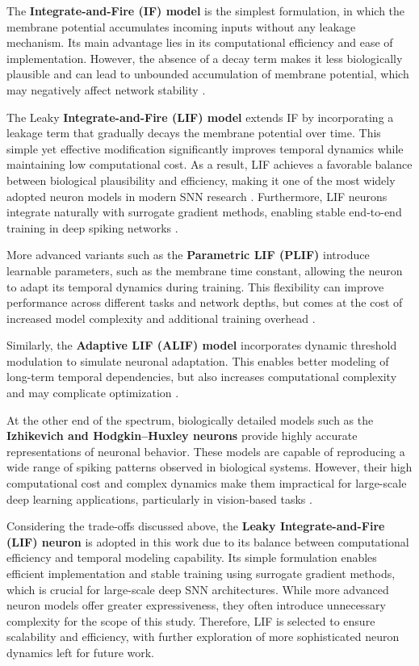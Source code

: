 \documentclass[../main.tex]{subfiles}
\begin{document}
The \textbf{Integrate-and-Fire (IF) model} is the simplest formulation, in which the membrane potential accumulates incoming inputs without any leakage mechanism. Its main advantage lies in its computational efficiency and ease of implementation. However, the absence of a decay term makes it less biologically plausible and can lead to unbounded accumulation of membrane potential, which may negatively affect network stability \cite{Gerstner_Kistler_2002}.

The Leaky \textbf{Integrate-and-Fire (LIF) model} extends IF by incorporating a leakage term that gradually decays the membrane potential over time. This simple yet effective modification significantly improves temporal dynamics while maintaining low computational cost. As a result, LIF achieves a favorable balance between biological plausibility and efficiency, making it one of the most widely adopted neuron models in modern SNN research \cite{Gerstner_Kistler_2002, neftci2019surrogate}. Furthermore, LIF neurons integrate naturally with surrogate gradient methods, enabling stable end-to-end training in deep spiking networks \cite{neftci2019surrogate}.

More advanced variants such as the \textbf{Parametric LIF (PLIF)} introduce learnable parameters, such as the membrane time constant, allowing the neuron to adapt its temporal dynamics during training. This flexibility can improve performance across different tasks and network depths, but comes at the cost of increased model complexity and additional training overhead \cite{fang2021incorporating}.

Similarly, the \textbf{Adaptive LIF (ALIF) model} incorporates dynamic threshold modulation to simulate neuronal adaptation. This enables better modeling of long-term temporal dependencies, but also increases computational complexity and may complicate optimization \cite{bellec2018long}.

At the other end of the spectrum, biologically detailed models such as the \textbf{Izhikevich and Hodgkin--Huxley neurons} provide highly accurate representations of neuronal behavior. These models are capable of reproducing a wide range of spiking patterns observed in biological systems. However, their high computational cost and complex dynamics make them impractical for large-scale deep learning applications, particularly in vision-based tasks \cite{izhikevich2003simple, hodgkin1952quantitative}.

Considering the trade-offs discussed above, the \textbf{Leaky Integrate-and-Fire (LIF) neuron} is adopted in this work due to its balance between computational efficiency and temporal modeling capability. Its simple formulation enables efficient implementation and stable training using surrogate gradient methods, which is crucial for large-scale deep SNN architectures. While more advanced neuron models offer greater expressiveness, they often introduce unnecessary complexity for the scope of this study. Therefore, LIF is selected to ensure scalability and efficiency, with further exploration of more sophisticated neuron dynamics left for future work.
\end{document}
